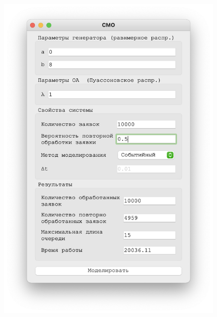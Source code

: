  \begin{figure}[!htb]
    \begin{minipage}{0.55\textwidth}
      \centering
      \includegraphics[width=1\linewidth]{1-5-s}
    \end{minipage}\hfill
    \begin{minipage}{0.55\textwidth}
      \centering

\end{minipage}
\end{figure}
